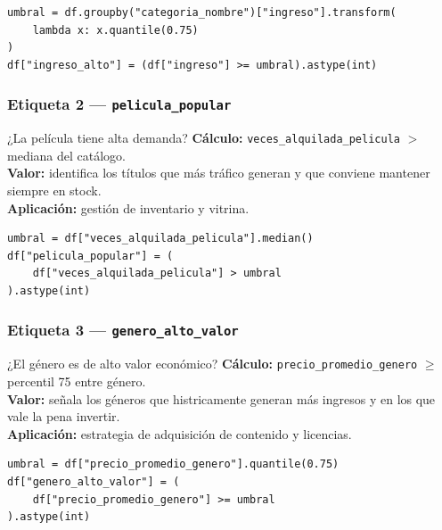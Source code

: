 \documentclass[12pt,a4paper]{article}
\begin{document}
\begin{lstlisting}[caption={C\'alculo de \texttt{ingreso\_alto}}]
umbral = df.groupby("categoria_nombre")["ingreso"].transform(
    lambda x: x.quantile(0.75)
)
df["ingreso_alto"] = (df["ingreso"] >= umbral).astype(int)
\end{lstlisting}

\subsubsection{Etiqueta 2 --- \texttt{pelicula\_popular}}

\begin{cajainfo}{¿La pel\'icula tiene alta demanda?}
  \textbf{C\'alculo:} \texttt{veces\_alquilada\_pelicula} $>$ mediana del cat\'alogo.\\[3pt]
  \textbf{Valor:} identifica los t\'itulos que m\'as tr\'afico generan
  y que conviene mantener siempre en stock.\\[3pt]
  \textbf{Aplicaci\'on:} gesti\'on de inventario y vitrina.
\end{cajainfo}

\begin{lstlisting}[caption={C\'alculo de \texttt{pelicula\_popular}}]
umbral = df["veces_alquilada_pelicula"].median()
df["pelicula_popular"] = (
    df["veces_alquilada_pelicula"] > umbral
).astype(int)
\end{lstlisting}

\subsubsection{Etiqueta 3 --- \texttt{genero\_alto\_valor}}

\begin{cajainfo}{¿El g\'enero es de alto valor econ\'omico?}
  \textbf{C\'alculo:} \texttt{precio\_promedio\_genero} $\geq$ percentil 75 entre g\'enero.\\[3pt]
  \textbf{Valor:} se\~nala los g\'eneros que histricamente generan m\'as
  ingresos y en los que vale la pena invertir.\\[3pt]
  \textbf{Aplicaci\'on:} estrategia de adquisici\'on de contenido y licencias.
\end{cajainfo}

\begin{lstlisting}[caption={C\'alculo de \texttt{genero\_alto\_valor}}]
umbral = df["precio_promedio_genero"].quantile(0.75)
df["genero_alto_valor"] = (
    df["precio_promedio_genero"] >= umbral
).astype(int)
\end{lstlisting}
\end{document}
